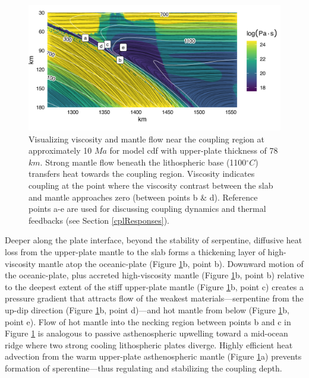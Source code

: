 \begin{figure}[htbp]

{\centering \includegraphics[width=1\linewidth,]{assets/figs/chpt2/fig6} 

}

\caption[Visualizing viscosity and mantle flow]{Visualizing viscosity and mantle flow near the coupling region at approximately 10 $Ma$ for model cdf with upper-plate thickness of 78 $km$. Strong mantle flow beneath the lithospheric base (1100$^{\circ}C$) transfers heat towards the coupling region. Viscosity indicates coupling at the point where the viscosity contrast between the slab and mantle approaches zero (between points b \& d). Reference points a-e are used for discussing coupling dynamics and thermal feedbacks (see Section \ref{cplResponses}).}\label{fig:flow}
\end{figure}

Deeper along the plate interface, beyond the stability of serpentine, diffusive heat loss from the upper-plate mantle to the slab forms a thickening layer of high-viscosity mantle atop the oceanic-plate (Figure \ref{fig:flow}b, point b). Downward motion of the oceanic-plate, plus accreted high-viscosity mantle (Figure \ref{fig:flow}b, point b) relative to the deepest extent of the stiff upper-plate mantle (Figure \ref{fig:flow}b, point c) creates a pressure gradient that attracts flow of the weakest materials---serpentine from the up-dip direction (Figure \ref{fig:flow}b, point d)---and hot mantle from below (Figure \ref{fig:flow}b, point e). Flow of hot mantle into the necking region between points b and c in Figure \ref{fig:flow} is analogous to passive asthenospheric upwelling toward a mid-ocean ridge where two strong cooling lithospheric plates diverge. Highly efficient heat advection from the warm upper-plate asthenospheric mantle (Figure \ref{fig:flow}a) prevents formation of sperentine---thus regulating and stabilizing the coupling depth.

